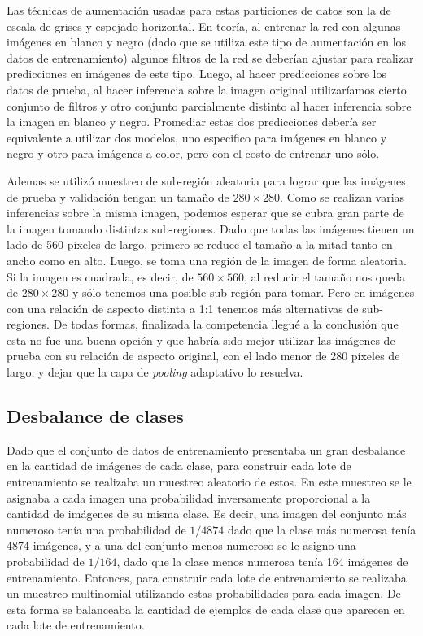 \documentclass[a4article]{article}
\begin{document}
Las técnicas de aumentación usadas para estas particiones de datos son la de escala de grises y espejado horizontal. En
teoría, al entrenar la red con algunas imágenes en blanco y negro (dado que se utiliza este tipo de aumentación en los
datos de entrenamiento) algunos filtros de la red se deberían ajustar para realizar predicciones en imágenes de este
tipo. Luego, al hacer predicciones sobre los datos de prueba, al hacer inferencia sobre la imagen original utilizaríamos
cierto conjunto de filtros y otro conjunto parcialmente distinto al hacer inferencia sobre la imagen en blanco y negro.
Promediar estas dos predicciones debería ser equivalente a utilizar dos modelos, uno especifico para imágenes en blanco y
negro y otro para imágenes a color, pero con el costo de entrenar uno sólo.

Ademas se utilizó muestreo de sub-región aleatoria para lograr que las imágenes de prueba y validación tengan un tamaño
de $280 \times 280$. Como se realizan varias inferencias sobre la misma imagen, podemos esperar que se cubra gran parte
de la imagen tomando distintas sub-regiones. Dado que todas las imágenes tienen un lado de 560 píxeles de largo, primero
se reduce el tamaño a la mitad tanto en ancho como en alto. Luego, se toma una región de la imagen de forma aleatoria.
Si la imagen es cuadrada, es decir, de $560 \times 560$, al reducir el tamaño nos queda de $280 \times 280$ y sólo
tenemos una posible sub-región para tomar.  Pero en imágenes con una relación de aspecto distinta a 1:1 tenemos más
alternativas de sub-regiones. De todas formas, finalizada la competencia llegué a la conclusión que esta no fue una
buena opción y que habría sido mejor utilizar las imágenes de prueba con su relación de aspecto original, con el lado
menor de 280 píxeles de largo, y dejar que la capa de \textit{pooling} adaptativo lo resuelva.

\subsection{Desbalance de clases}
Dado que el conjunto de datos de entrenamiento presentaba un gran desbalance en la cantidad de imágenes de cada clase,
para construir cada lote de entrenamiento se realizaba un muestreo aleatorio de estos. En este muestreo se le asignaba a
cada imagen una probabilidad inversamente proporcional a la cantidad de imágenes de su misma clase. Es decir, una imagen
del conjunto más numeroso tenía una probabilidad de $1 / 4874$ dado que la clase más numerosa tenía 4874 imágenes, y a
una del conjunto menos numeroso se le asigno una probabilidad de $1 / 164$, dado que la clase menos numerosa tenía 164
imágenes de entrenamiento. Entonces, para construir cada lote de entrenamiento se realizaba un muestreo multinomial
utilizando estas probabilidades para cada imagen. De esta forma se balanceaba la cantidad de ejemplos de cada clase que
aparecen en cada lote de entrenamiento.
\end{document}
